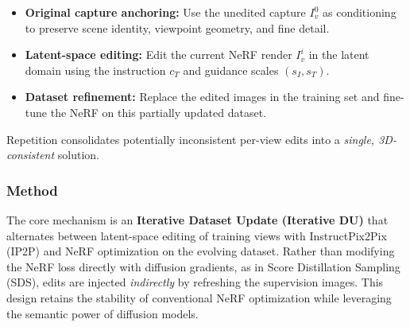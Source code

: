 \begin{enrichment}
\begin{enrichment}
        \begin{itemize}
            \item \textbf{Original capture anchoring:} \; Use the unedited capture \(I_v^0\) as conditioning to preserve scene identity, viewpoint geometry, and fine detail.
            \item \textbf{Latent-space editing:} \; Edit the current NeRF render \(I_v^i\) in the latent domain using the instruction \(c_T\) and guidance scales \((s_I,s_T)\).
            \item \textbf{Dataset refinement:} \; Replace the edited images in the training set and fine-tune the NeRF on this partially updated dataset.
        \end{itemize}
        
        Repetition consolidates potentially inconsistent per-view edits into a \emph{single, 3D-consistent} solution.
        
        \newpage
        
        \subsubsection{Method}
        \label{subsec:chapter23_instructnerf2nerf_method}
        The core mechanism is an \textbf{Iterative Dataset Update (Iterative DU)} that alternates between latent-space editing of training views with InstructPix2Pix (IP2P) and NeRF optimization on the evolving dataset. Rather than modifying the NeRF loss directly with diffusion gradients, as in Score Distillation Sampling (SDS), edits are injected \emph{indirectly} by refreshing the supervision images. This design retains the stability of conventional NeRF optimization while leveraging the semantic power of diffusion models.
        

\end{enrichment}
\end{enrichment}
